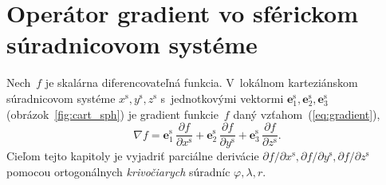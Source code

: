 \documentclass[a4paper, 12pt]{book}
\let\vec\mathbf
\begin{document}
\section{Operátor gradient vo sférickom súradnicovom systéme}
\label{app:gradient_in_spherical_coordinates}

Nech~$f$ je skalárna diferencovateľná funkcia.  V~lokálnom karteziánskom 
súradnicovom systéme $x^{\mathrm{s}}, y^{\mathrm{s}}, z^{\mathrm{s}}$ 
s~jednotkovými vektormi $\vec e^\mathrm{s}_1, \vec e^\mathrm{s}_2, \vec 
e^\mathrm{s}_3$ (obrázok~\ref{fig:cart_sph}) je gradient funkcie~$f$ daný 
vzťahom~(\ref{eq:gradient}),
%
\begin{equation}
\nabla f = \vec e^\mathrm{s}_1 \, \frac{\partial f}{\partial x^{\mathrm{s}}} 
+ \vec e^\mathrm{s}_2 \, \frac{\partial f}{\partial y^{\mathrm{s}}} + \vec 
e^\mathrm{s}_3 \, \frac{\partial f}{\partial z^{\mathrm{s}}}{.}
\end{equation}
%
Cieľom tejto kapitoly je vyjadriť parciálne derivácie $\partial f \slash 
\partial x^{\mathrm{s}}, \partial f \slash \partial y^{\mathrm{s}}, \partial 
f \slash \partial z^{\mathrm{s}}$ pomocou ortogonálnych \emph{krivočiarych} 
súradníc $\varphi, \lambda, r$.
\end{document}
